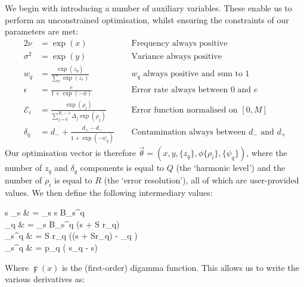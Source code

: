 \documentclass[fleqn,usenatbib]{mnras}
\newcommand{\pdiv}[2]{\frac{\partial #1}{\partial #2}}
\begin{document}
{					We begin with introducing a number of auxiliary variables. These enable us to perform an unconstrained optimisation, whilst ensuring the constraints of our parameters are met:
					\begin{alignat}{2}
						\nu & = \exp(x) \quad && \text{Frequency always positive}
						\\
						\sigma^2 &= \exp(y) \quad && \text{Variance always positive}
						\\
						w_q & = \frac{\exp(z_q)}{\sum_r \exp(z_r)}\quad && \text{$w_q$ always positive and sum to 1}
						\\
						\epsilon & = \frac{e}{1+\exp(-\phi)} && \text{Error rate always between 0 and $e$}
						\\
						\mathcal{E}_i & = \frac{\exp{(\rho_i)}}{\sum_{j=0}^{R_\epsilon-1} \Delta_j \exp{(\rho_j)}} && \text{Error function normalised on $[0,M]$}
						\\
						\delta_q & = d_- + \frac{d_+ - d_-}{1 + \exp(-\psi_q)} ~~&& \text{Contamination always between $d_-$ and $d_+$}
					\end{alignat}
					Our optimisation vector is therefore $\vec{\theta} = (x,y,\{z_q\}, \phi \{\rho_i\}, \{\psi_q\})$, where the number of $z_q$ and $\delta_q$ components is equal to $Q$ (the `harmonic level') and the number of $\rho_i$ is equal to $R$ (the `error resolution'), all of which are user-provided values. We then define the following intermediary values:
					\begin{spalign}
						\langle s \rangle_s & = \sum_s s B_s^q
						\\
						\langle \digamma \rangle_q & = \sum_s B_s^q \digamma(s + S r_q)
						\\
						\tau_s^q & = S r_q \left(\digamma(s + Sr_q) - \langle \digamma_q \rangle \right)
						\\
						\lambda_s^q & = p_q \left( \langle s_q \rangle - s\right)
					\end{spalign}
					Where $\digamma(x)$ is the (first-order) digamma function. This allows us to write the various derivatives as:
					\begin{description}
							

\end{description}}
\end{document}
